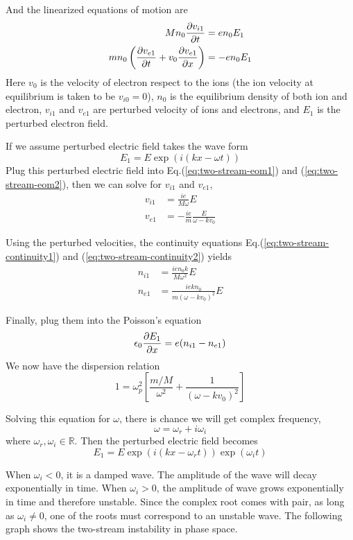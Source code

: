 And the linearized equations of motion are
\begin{align}
	Mn_0\pdv{v_{i1}}{t}                                   & = en_0E_1  \label{eq:two-stream-eom1} \\
	mn_0\left(\pdv{v_{e1}}{t} + v_0\pdv{v_{e1}}{x}\right) & = -en_0E_1 \label{eq:two-stream-eom2}
\end{align}
Here $v_0$ is the velocity of electron respect to the ions (the ion velocity at equilibrium is taken to be $v_{i0}=0$), $n_0$ is the equilibrium density of both ion and electron, $v_{i1}$ and $v_{e1}$ are perturbed velocity of ions and electrons, and $E_1$ is the perturbed electron field.

If we assume perturbed electric field takes the wave form
\[ E_1 = E\exp(i(kx-\omega t)) \]
Plug this perturbed electric field into Eq.(\ref{eq:two-stream-eom1}) and (\ref{eq:two-stream-eom2}), then we can solve for $v_{i1}$ and $v_{e1}$,
\begin{align*}
	v_{i1} & = \frac{ie}{M\omega} E               \\
	v_{e1} & = -\frac{ie}{m}\frac{E}{\omega-kv_0}
\end{align*}

Using the perturbed velocities, the continuity equations Eq.(\ref{eq:two-stream-continuity1}) and (\ref{eq:two-stream-continuity2}) yields
\begin{align*}
	n_{i1} & = \frac{ien_0k}{M\omega^2} E       \\
	n_{e1} & = \frac{iekn_0}{m(\omega-kv_0)^2}E
\end{align*}

Finally, plug them into the Poisson's equation
\[ \epsilon_0 \pdv{E_1}{x} = e(n_{i1}-n_{e1}) \]
We now have the dispersion relation
\[ 1 = \omega_p^2 \left[\frac{m/M}{\omega^2}+\frac{1}{(\omega-kv_0)^2}\right] \]

Solving this equation for $\omega$, there is chance we will get complex frequency,
\[ \omega = \omega_r + i\omega_i \]
where $\omega_r, \omega_i \in\mathbb{R}$. Then the perturbed electric field becomes
\[ E_1 = E\exp(i(kx-\omega_rt))\exp(\omega_it) \]

When $\omega_i < 0$, it is a damped wave. The amplitude of the wave will decay exponentially in time. When $\omega_i > 0$, the amplitude of wave grows exponentially in time and therefore unstable. Since the complex root comes with pair, as long as $\omega_i\neq 0$, one of the roots must correspond to an unstable wave. The following graph shows the two-stream instability in phase space.

